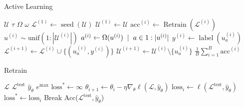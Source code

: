 \documentclass[]{article}
\begin{document}
\begin{minipage}{0.59\linewidth}
	\begin{algorithm}[H]
		\caption{Active Learning}\label{alg:active_learning}
		\begin{algorithmic}[1]
			\Require $\mathcal{U}$ 
			\Require $\tau$ 
			\Require $\Omega$ 
			\Require $\omega$ 
			\State $\mathcal{L}^{(1)} \gets \operatorname{seed}(\mathcal{U})$  
			\State $\mathcal{U}^{(1)} \gets \mathcal{U}$
				\State $\text{acc}^{(i)} \gets \operatorname{Retrain}(\mathcal{L}^{(i)})$  %
				\State $u^{(i)} \sim \text{unif}(1:|\mathcal{U}^{(i)}|)$
				\State $a^{(i)} \gets \Omega(u^{(i)}) \hspace{2mm}|\hspace{2mm} a \in 1:|u^{(i)}|$ 
				\State $y^{(i)} \gets \operatorname{label}(u^{(i)}_{a})$ 
				\State $\mathcal{L}^{(i+1)} \gets \mathcal{L}^{(i)} \cup \{(u^{(i)}_a, y^{(i)})\}$
				\State $\mathcal{U}^{(i+1)} \gets \mathcal{U}^{(i)} \setminus \{u^{(i)}_a\}$
			\EndFor
			\State
			\Return $\frac{1}{B} \sum_{i=1}^{B} \text{acc}^{(i)}$
		\end{algorithmic}
	\end{algorithm}
\end{minipage}
\hspace{3mm}
\begin{minipage}{0.35\linewidth}
	\begin{algorithm}[H]
		\caption{Retrain}\label{alg:retrain}
		\begin{algorithmic}[1]
			\Require $\mathcal{L}$ 
			\Require $\mathcal{L}^\text{test}$ 
			\Require $\hat y_\theta$ 
			\Require $e^\text{max}$ 
			\State $\text{loss}^* \gets \infty$
			\State $\theta_{i+1} \gets \theta_i - \eta \nabla_\theta \ell(\mathcal{L}, \hat y_{\theta})$
			\State $\text{loss}_i \gets \ell(\mathcal{L}^\text{test}, \hat y_{\theta})$
			\State $\text{loss}^* \gets \text{loss}_i$
			\Else
			\State Break
			\EndIf
			\EndFor
			\State
			\Return Acc($\mathcal{L}^\text{test}, \hat y_{\theta}$)
		\end{algorithmic}
	\end{algorithm}
\end{minipage}
\end{document}
